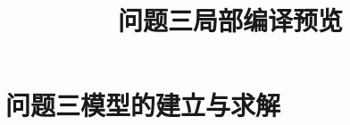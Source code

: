 \documentclass[withoutpreface]{../../../paper/cumcmthesis}
\title{问题三局部编译预览}
\begin{document}
\maketitle
\section{问题三模型的建立与求解}

\end{document}

